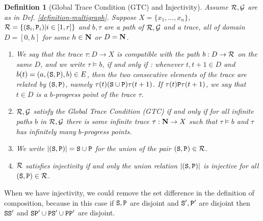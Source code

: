 \documentclass{lmcs}
\newtheorem{definition}[theorem]{Definition}
\begin{document}
\begin{definition}[Global Trace Condition (GTC) and Injectivity]
\label{definition-GTC-inj}
Assume ${\mathcal R}, {\mathcal G}$ are as in  Def. \ref{definition-multigraph}.
Suppose $X=\{x_1, \ldots, x_n\}$, ${\mathcal R} =\{({\tt S}_i, {\tt P}_i)| i \in [1,r]\}$
and $b, \tau$ are a path of ${\mathcal R}, {\mathcal G}$ and a trace, all of domain 
$D=[0,h]$ for some $h \in {\bf N}$ or $D={\bf N}$.

\begin{enumerate}

\item
We say that the trace $\tau:D \rightarrow X$ is \emph{compatible} with the path
$b :D \rightarrow {\mathcal R}$ on the same $D$, 
and we write $\tau \models b$, if and only if :
whenever $t, t+1 \in D$ and $b(t) = (a,({\tt S},{\tt P}),b) \in E$,
then the two consecutive elements  of the trace are related by $({\tt S},{\tt P})$, namely
 $\tau(t) ({\tt S} \cup {\tt P}) \tau(t+1)$.
If $\tau(t) {\tt P} \tau(t+1)$,
we say that $t \in D$ is a \emph{$b$-progress point} of the trace $\tau$.

\item
${\mathcal R},{\mathcal G}$ satisfy the \emph{Global Trace Condition} (GTC) if and only if
for all infinite paths $b$ in ${\mathcal R},{\mathcal G}$
there is some infinite trace $\tau:{\bf N} \rightarrow X$ such that
$\tau \models b$ and $\tau$ has infinitely many $b$-progress points.

\item
We write ${| ({\tt S}, {\tt P}) |}
= {\tt S} \cup {\tt P}$ for the \emph{union} of the pair $({\tt S}, {\tt P}) \in {\mathcal R}$.


\item
${\mathcal R}$ satisfies \emph{injectivity} if and only 
the union relation ${| ({\tt S}, {\tt P}) |}$ is injective
for all $({\tt S}, {\tt P}) \in {\mathcal R}$.

\end{enumerate}

\end{definition}


When we have injectivity, we could remove the set difference 
 in the definition of composition, because in this case if ${\tt S},{\tt P}$ 
are disjoint and ${\tt S}', {\tt P}'$ are disjoint then  ${\tt S} {\tt S}'$ and 
${\tt S} {\tt P}' \cup {\tt P} {\tt S}' \cup {\tt P} {\tt P}'$ are disjoint. 
\end{document}
